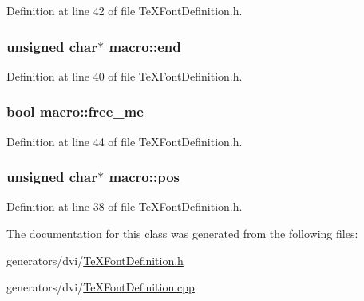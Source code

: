 Definition at line 42 of file Te\+X\+Font\+Definition.\+h.

\hypertarget{classmacro_af735e3479e8a7088d4e84d918dbf73f7}{
\subsubsection[{end}]{\setlength{\rightskip}{0pt plus 5cm}unsigned char$\ast$ macro\+::end}}\label{classmacro_af735e3479e8a7088d4e84d918dbf73f7}


Definition at line 40 of file Te\+X\+Font\+Definition.\+h.

\hypertarget{classmacro_a2225237c5521630df5811ab6a8802c45}{
\subsubsection[{free\+\_\+me}]{\setlength{\rightskip}{0pt plus 5cm}bool macro\+::free\+\_\+me}}\label{classmacro_a2225237c5521630df5811ab6a8802c45}


Definition at line 44 of file Te\+X\+Font\+Definition.\+h.

\hypertarget{classmacro_a56bb221e766cbb0240c9fb2cd443e2fe}{
\subsubsection[{pos}]{\setlength{\rightskip}{0pt plus 5cm}unsigned char$\ast$ macro\+::pos}}\label{classmacro_a56bb221e766cbb0240c9fb2cd443e2fe}


Definition at line 38 of file Te\+X\+Font\+Definition.\+h.



The documentation for this class was generated from the following files\+:\begin{DoxyCompactItemize}
\item 
generators/dvi/\hyperlink{TeXFontDefinition_8h}{Te\+X\+Font\+Definition.\+h}\item 
generators/dvi/\hyperlink{TeXFontDefinition_8cpp}{Te\+X\+Font\+Definition.\+cpp}\end{DoxyCompactItemize}
